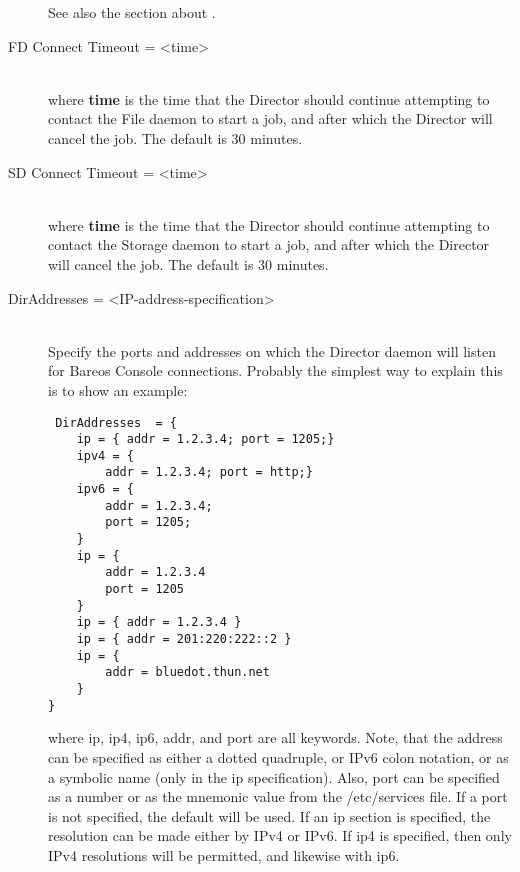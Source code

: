 \begin{description}
See also the section about .

\item [FD Connect Timeout = {\textless}time{\textgreater}] \hfill \\
where {\bf time} is the time that the Director should continue
attempting to contact the File daemon to start a job, and after which
the Director will cancel the job.  The default is 30 minutes.

\item [SD Connect Timeout = {\textless}time{\textgreater}] \hfill \\
where {\bf time} is the time that the Director should continue
attempting to contact the Storage daemon to start a job, and after which
the Director will cancel the job.  The default is 30 minutes.

\item [DirAddresses = {\textless}IP-address-specification{\textgreater}] \hfill \\
Specify the ports and addresses on which the Director daemon will listen
for Bareos Console connections.  Probably the simplest way to explain
this is to show an example:

\footnotesize
\begin{verbatim}
 DirAddresses  = {
    ip = { addr = 1.2.3.4; port = 1205;}
    ipv4 = {
        addr = 1.2.3.4; port = http;}
    ipv6 = {
        addr = 1.2.3.4;
        port = 1205;
    }
    ip = {
        addr = 1.2.3.4
        port = 1205
    }
    ip = { addr = 1.2.3.4 }
    ip = { addr = 201:220:222::2 }
    ip = {
        addr = bluedot.thun.net
    }
}
\end{verbatim}
\normalsize

where ip, ip4, ip6, addr, and port are all keywords. Note, that  the address
can be specified as either a dotted quadruple, or  IPv6 colon notation, or as
a symbolic name (only in the ip specification).  Also, port can be specified
as a number or as the mnemonic value from  the /etc/services file.  If a port
is not specified, the default will be used. If an ip  section is specified,
the resolution can be made either by IPv4 or  IPv6. If ip4 is specified, then
only IPv4 resolutions will be permitted,  and likewise with ip6.


\end{description}
